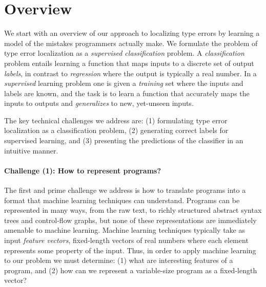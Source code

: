 \section{Overview}
\label{sec:overview}

We start with an overview of our approach to localizing type errors by
learning a model of the mistakes programmers actually make.
%
We formulate the problem of type error localization as a
\emph{supervised classification} problem.
%
A \emph{classification} problem entails learning a function that maps
inputs to a discrete set of output \emph{labels}, in contrast to
\emph{regression} where the output is typically a real number.
%
In a \emph{supervised} learning problem one is given a \emph{training}
set where the inputs and labels are known, and the task is to learn a
function that accurately maps the inputs to outputs and
\emph{generalizes} to new, yet-unseen inputs.

The key technical challenges we address are:
%
(1) formulating type error localization as a classification problem,
%
(2) generating correct labels for supervised learning, and
%
(3) presenting the predictions of the classifier in an intuitive manner.

\paragraph{\textbf{Challenge (1): How to represent programs?}}
The first and prime challenge we address is how to translate programs
into a format that machine learning techniques can understand.
%
Programs can be represented in many ways, from the raw text, to richly
structured abstract syntax trees and control-flow graphs, but none
of these representations are immediately amenable to machine learning.
%
Machine learning techniques typically take as input \emph{feature
vectors}, fixed-length vectors of real numbers where each element
represents some property of the input.
%
Thus, in order to apply machine learning to our problem we must
determine:
%
(1) what are interesting features of a program, and
%
(2) how can we represent a variable-size program as a fixed-length vector?

